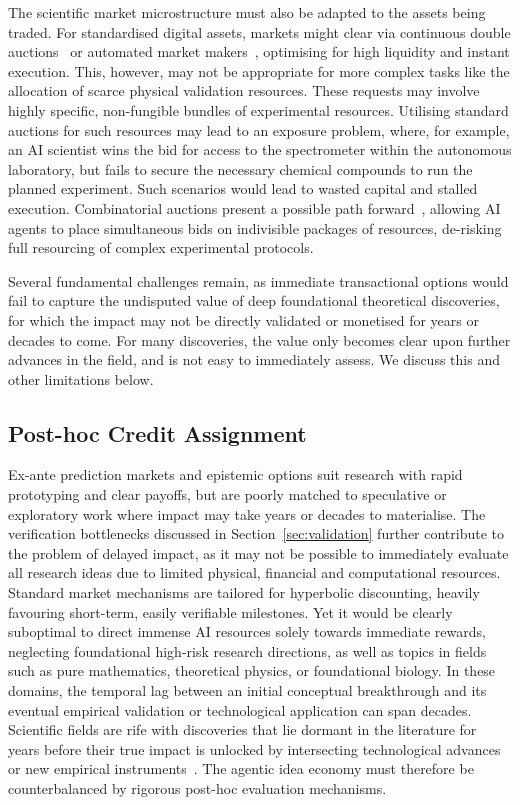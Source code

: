 \documentclass[11pt, a4paper, twocolumn, goog]{google}
\begin{document}
The scientific market microstructure must also be adapted to the assets being traded. For standardised digital assets, markets might clear via continuous double auctions~\citep{gjerstad1998price} or automated market makers~\citep{milionis2022automated, he2024optimal}, optimising for high liquidity and instant execution. This, however, may not be appropriate for more complex tasks like the allocation of scarce physical validation resources. These requests may involve highly specific, non-fungible bundles of experimental resources. Utilising standard auctions for such resources may lead to an exposure problem, where, for example, an AI scientist wins the bid for access to the spectrometer within the autonomous laboratory, but fails to secure the necessary chemical compounds to run the planned experiment. Such scenarios would lead to wasted capital and stalled execution. Combinatorial auctions present a possible path forward~\citep{cramton2006combinatorial}, allowing AI agents to place simultaneous bids on indivisible packages of resources, de-risking full resourcing of complex experimental protocols.

Several fundamental challenges remain, as immediate transactional options would fail to capture the undisputed value of deep foundational theoretical discoveries, for which the impact may not be directly validated or monetised for years or decades to come. For many discoveries, the value only becomes clear upon further advances in the field, and is not easy to immediately assess. We discuss this and other limitations below.

\subsection{Post-hoc Credit Assignment}

Ex-ante prediction markets and epistemic options suit research with rapid prototyping and clear payoffs, but are poorly matched to speculative or exploratory work where impact may take years or decades to materialise. The verification bottlenecks discussed in Section~\ref{sec:validation} further contribute to the problem of delayed impact, as it may not be possible to immediately evaluate all research ideas due to limited physical, financial and computational resources. Standard market mechanisms are tailored for hyperbolic discounting, heavily favouring short-term, easily verifiable milestones. Yet it would be clearly suboptimal to direct immense AI resources solely towards immediate rewards, neglecting foundational high-risk research directions, as well as topics in fields such as pure mathematics, theoretical physics, or foundational biology. In these domains, the temporal lag between an initial conceptual breakthrough and its eventual empirical validation or technological application can span decades. Scientific fields are rife with discoveries that lie dormant in the literature for years before their true impact is unlocked by intersecting technological advances or new empirical instruments~\citep{ke2015defining}. The agentic idea economy must therefore be counterbalanced by rigorous post-hoc evaluation mechanisms.
\end{document}
